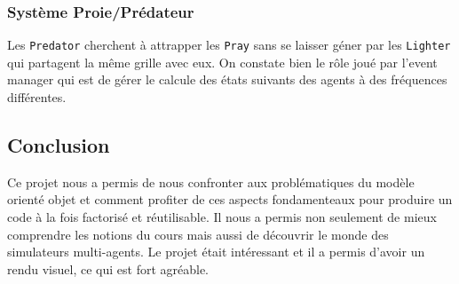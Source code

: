 \documentclass [a4paper,11pt,titlepage] {article}
\begin{document}
\subsubsection {Système Proie/Prédateur}
Les \texttt{Predator} cherchent à attrapper les \texttt{Pray} sans se laisser géner par les \texttt{Lighter} qui partagent la même grille avec eux. On constate bien le rôle joué par l'event manager qui est de gérer le calcule des états suivants des agents à des fréquences différentes.

\begin{center}
\section* {Conclusion }
\end{center}

Ce projet nous a permis de nous confronter aux problématiques du modèle orienté objet et comment profiter de ces aspects fondamenteaux pour produire un code à la fois factorisé et réutilisable. Il nous a permis non seulement de mieux comprendre les notions du cours
mais aussi de découvrir le monde des simulateurs multi-agents. Le
projet était intéressant et il a permis d’avoir un rendu visuel, ce qui est fort agréable.
\end{document}
